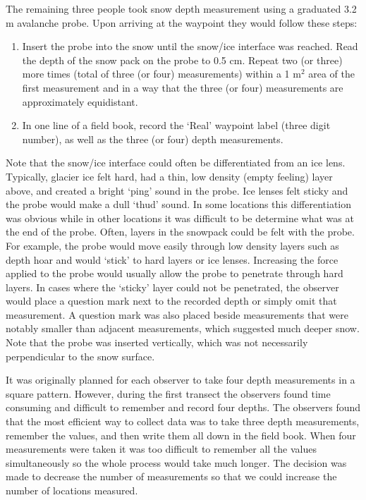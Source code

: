 \documentclass{sfuthesis}
\begin{document}
The remaining three people took snow depth measurement using a graduated 3.2 m avalanche probe. Upon arriving at the waypoint they would follow these steps:
\begin{enumerate}
\item Insert the probe into the snow until the snow/ice interface was reached. Read the depth of the snow pack on the probe to 0.5 cm. Repeat two (or three) more times (total of three (or four) measurements) within a 1 m$^2$ area of the first measurement and in a way that the three (or four) measurements are approximately equidistant. 
\item In one line of a field book, record the `Real' waypoint label (three digit number), as well as the three (or four) depth measurements. 
\end{enumerate}
Note that the snow/ice interface could often be differentiated from an ice lens. Typically, glacier ice felt hard, had a thin, low density (empty feeling) layer above, and created a bright `ping' sound in the probe. Ice lenses felt sticky and the probe would make a dull `thud' sound. In some locations this differentiation was obvious while in other locations it was difficult to be determine what was at the end of the probe. Often, layers in the snowpack could be felt with the probe. For example, the probe would move easily through low density layers such as depth hoar and would `stick' to hard layers or ice lenses. Increasing the force applied to the probe would usually allow the probe to penetrate through hard layers. In cases where the `sticky' layer could not be penetrated, the observer would place a question mark next to the recorded depth or simply omit that measurement. A question mark was also placed beside measurements that were notably smaller than adjacent measurements, which suggested much deeper snow. Note that the probe was inserted vertically, which was not necessarily perpendicular to the snow surface.

It was originally planned for each observer to take four depth measurements in a square pattern. However, during the first transect the observers found time consuming and difficult to remember and record four depths. The observers found that the most efficient way to collect data was to take three depth measurements, remember the values, and then write them all down in the field book. When four measurements were taken it was too difficult to remember all the values simultaneously so the whole process would take much longer. The decision was made to decrease the number of measurements so that we could increase the number of locations measured. 
\end{document}
